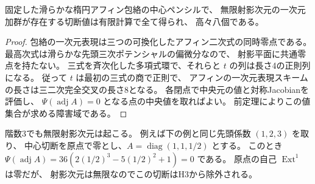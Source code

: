 \begin{corollary}\label{cor:cubic-CY-three-alpha-elliptic-character-critical-values}
固定した滑らかな楕円アフィン包絡の中心ペンシルで、
無限射影次元の一次元加群が存在する切断値は有限計算で全て得られ、
高々八個である。
\end{corollary}
\begin{proof}
包絡の一次元表現は三つの可換化したアフィン二次式の同時零点である。
最高次式は滑らかな先頭三次ポテンシャルの偏微分なので、
射影平面に共通零点を持たない。
三式を斉次化した多項式環で、それらと $t$ の列は長さ4の正則列になる。
従って $t$ は最初の三式の商で正則で、
アフィンの一次元表現スキームの長さは三二次完全交叉の長さ8となる。
各閉点で中央元の値と対称Jacobianを評価し、
$\Psi(\operatorname{adj} A)=0$ となる点の中央値を取ればよい。
前定理によりこの値集合が求める障害域である。
\end{proof}

階数3でも無限射影次元は起こる。
例えば下の例と同じ先頭係数 $(1,2,3)$ を取り、
中心切断を原点で零とし、$A=\operatorname{diag}(1,1,1/2)$ とする。
このとき $\Psi(\operatorname{adj} A)
=36(2(1/2)^3-5(1/2)^2+1)=0$ である。
原点の自己 $\operatorname{Ext}^1$ は零だが、
射影次元は無限なのでこの切断はH3から除外される。

